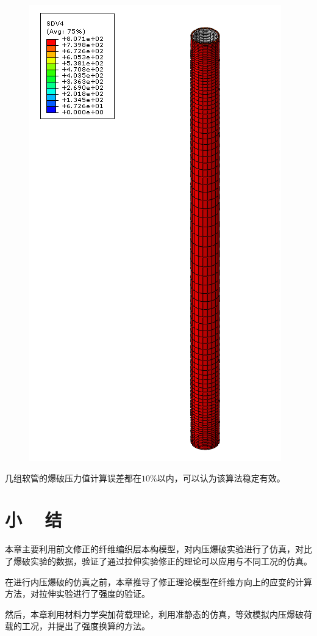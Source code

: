 \begin{figure}[!htp]
{		\includegraphics[height=0.33\textheight]{figure/chap6/2}
		\label{fig:chap6-2}
	}
	\label{fig:chap6-hose-burst}
\end{figure}


几组软管的爆破压力值计算误差都在$ 10\% $以内，可以认为该算法稳定有效。


\section{小 ~ 结}

本章主要利用前文修正的纤维编织层本构模型，对内压爆破实验进行了仿真，对比了爆破实验的数据，验证了通过拉伸实验修正的理论可以应用与不同工况的仿真。

在进行内压爆破的仿真之前，本章推导了修正理论模型在纤维方向上的应变的计算方法，对拉伸实验进行了强度的验证。

然后，本章利用材料力学突加荷载理论，利用准静态的仿真，等效模拟内压爆破荷载的工况，并提出了强度换算的方法。
